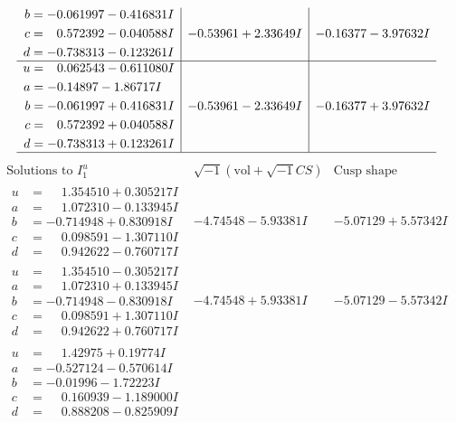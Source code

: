 \documentclass[1p]{elsarticle_modified}
\theoremstyle{definition}
\newcommand{\I}{\sqrt{-1}}
\begin{document}
$$\begin{array}{c|c|c}
\begin{aligned}
b &= -0.061997 - 0.416831 I \\
c &= \phantom{-}0.572392 - 0.040588 I \\
d &= -0.738313 - 0.123261 I\end{aligned}
 & -0.53961 + 2.33649 I & -0.16377 - 3.97632 I \\ \hline\begin{aligned}
u &= \phantom{-}0.062543 - 0.611080 I \\
a &= -0.14897 - 1.86717 I \\
b &= -0.061997 + 0.416831 I \\
c &= \phantom{-}0.572392 + 0.040588 I \\
d &= -0.738313 + 0.123261 I\end{aligned}
 & -0.53961 - 2.33649 I & -0.16377 + 3.97632 I\\
 \hline 
 \end{array}$$\newpage$$\begin{array}{c|c|c}  
\text{Solutions to }I^u_{1}& \I (\text{vol} + \sqrt{-1}CS) & \text{Cusp shape}\\
 \hline 
\begin{aligned}
u &= \phantom{-}1.354510 + 0.305217 I \\
a &= \phantom{-}1.072310 - 0.133945 I \\
b &= -0.714948 + 0.830918 I \\
c &= \phantom{-}0.098591 - 1.307110 I \\
d &= \phantom{-}0.942622 - 0.760717 I\end{aligned}
 & -4.74548 - 5.93381 I & -5.07129 + 5.57342 I \\ \hline\begin{aligned}
u &= \phantom{-}1.354510 - 0.305217 I \\
a &= \phantom{-}1.072310 + 0.133945 I \\
b &= -0.714948 - 0.830918 I \\
c &= \phantom{-}0.098591 + 1.307110 I \\
d &= \phantom{-}0.942622 + 0.760717 I\end{aligned}
 & -4.74548 + 5.93381 I & -5.07129 - 5.57342 I \\ \hline\begin{aligned}
u &= \phantom{-}1.42975 + 0.19774 I \\
a &= -0.527124 - 0.570614 I \\
b &= -0.01996 - 1.72223 I \\
c &= \phantom{-}0.160939 - 1.189000 I \\
d &= \phantom{-}0.888208 - 0.825909 I\end{aligned}

\end{array}$$
\end{document}
